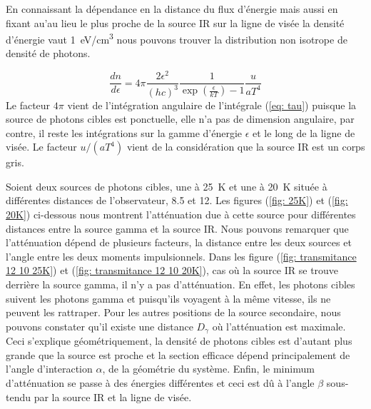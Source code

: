\documentclass[a4paper,12pt,twoside]{article}
\begin{document}
En connaissant la dépendance en la distance du flux d'énergie mais aussi en fixant au'au lieu le plus proche de la source IR sur la ligne de visée la densité d'énergie vaut \SI{1}{\eV/\cm^3} nous pouvons trouver la distribution non isotrope de densité de photons.

\begin{equation}
	\frac{dn}{d\epsilon} = 4\pi \frac{2\epsilon^2}{(h c)^3} \frac{1}{\exp\left(\frac{\epsilon}{kT}\right) - 1} \frac{u}{a T^4}
\end{equation}
Le facteur $4\pi$ vient de l'intégration angulaire de l'intégrale (\ref{eq: tau}) puisque la source de photons cibles est ponctuelle, elle n'a pas de dimension angulaire, par contre, il reste les intégrations sur la gamme d'énergie $\epsilon$ et le long de la ligne de visée. Le facteur $u/(a T^4)$ vient de la considération que la source IR est un corps gris.

Soient deux sources de photons cibles, une à \SI{25}{\K} et une à \SI{20}{\K} située à différentes distances de l'observateur, \SI{8.5}{\kpc} et \SI{12}{\kpc}. Les figures (\ref{fig: 25K}) et (\ref{fig: 20K}) ci-dessous nous montrent l'atténuation due à cette source pour différentes distances entre la source gamma et la source IR. Nous pouvons remarquer que l'atténuation dépend de plusieurs facteurs, la distance entre les deux sources et l'angle entre les deux moments impulsionnels. Dans les figure (\ref{fig: transmitance 12 10 25K}) et (\ref{fig: transmitance 12 10 20K}), cas où la source IR se trouve derrière la source gamma, il n'y a pas d'atténuation. En effet, les photons cibles suivent les photons gamma et puisqu'ils voyagent à la même vitesse, ils ne peuvent les rattraper. Pour les autres positions de la source secondaire, nous pouvons constater qu'il existe une distance $D_\gamma$ où l'atténuation est maximale. Ceci s'explique géométriquement, la densité de photons cibles est d'autant plus grande que la source est proche et la section efficace dépend principalement de l'angle d'interaction $\alpha$, de la géométrie du système. Enfin, le minimum d'atténuation se passe à des énergies différentes et ceci est dû à l'angle $\beta$ sous-tendu par la source IR et la ligne de visée.
\end{document}
